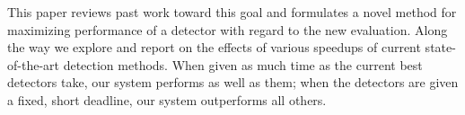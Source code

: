 This paper reviews past work toward this goal and formulates a novel method for maximizing performance of a detector with regard to the new evaluation.
Along the way we explore and report on the effects of various speedups of current state-of-the-art detection methods.
When given as much time as the current best detectors take, our system performs as well as them; when the detectors are given a fixed, short deadline, our system outperforms all others.